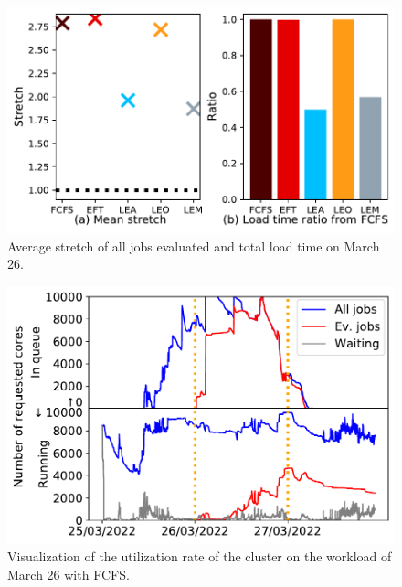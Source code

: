 \documentclass[conference,10pt]{IEEEtran}
\begin{document}
\begin{figure}[t]\centering\includegraphics[width=0.9\linewidth]{../MBSS/plot/Results_FCFS_Score_Backfill_2022-03-26->2022-03-26_V10000_Mean_Stretch_Total_waiting_for_a_load_time_and_transfer_time_450_128_32_256_4_1024.pdf}\caption{Average stretch of all jobs evaluated and total load time on March 26.}\label{stretch.03-26}\end{figure}
\begin{figure}[t]\centering\includegraphics[width=0.9\linewidth]{../MBSS/plot/Cluster_usage/2022-03-26->2022-03-26_V10000_Fcfs_Used_nodes_Reduced_450_128_32_256_4_1024_core_by_core.pdf}\caption{Visualization of the utilization rate of the cluster on the workload of March 26 with FCFS.}\label{cluster_usage.03-26_fcfs}\end{figure}
\end{document}
